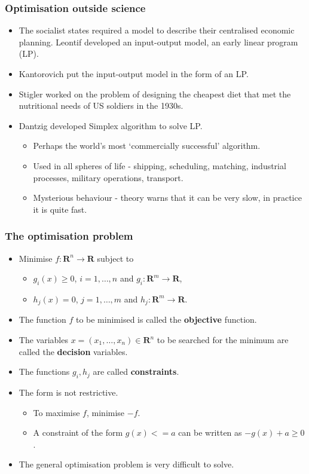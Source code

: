 \documentclass{beamer}
\newcommand{\sor}{\mathbf{R}}
\begin{document}
\begin{frame}
\frametitle{Optimisation outside science}
\begin{itemize}
\item The socialist states required a model to describe their centralised 
economic planning. Leontif developed an input-output model, an early linear
program (LP).
\item Kantorovich put the input-output model in the form of an LP.
\item Stigler worked on the problem of designing the cheapest diet that met
the nutritional needs of US soldiers in the 1930s.
\item Dantzig developed Simplex algorithm to solve LP.
\begin{itemize}
\item Perhaps the world's most `commercially successful' algorithm.
\item Used in all spheres of life - shipping, scheduling, matching, industrial
processes, military operations, transport.
\item Mysterious behaviour - theory warns that it can be very slow, in
practice it is quite fast.
\end{itemize}
\end{itemize}
\end{frame}

\begin{frame}
\frametitle{The optimisation problem}
\begin{itemize}
\item Minimise $f: \sor^n \rightarrow \sor$ subject to
\begin{itemize}
\item $g_i(x) \ge 0$, $i = 1, \ldots, n$ and $g_i: \sor^m \rightarrow \sor$,
\item $h_j(x) = 0$, $j = 1, \ldots, m$ and $h_j: \sor^m \rightarrow \sor$.
\end{itemize}
\item The function $f$ to be minimised is called the \textbf{objective}
function.
\item The variables $x = (x_1, \ldots, x_n) \in \sor^n$ to be searched for
the minimum are called the \textbf{decision} variables.
\item The functions $g_i, h_j$ are called \textbf{constraints}.
\item The form is not restrictive.
\begin{itemize}
\item To maximise $f$, minimise $-f$.
\item A constraint of the form $g(x) <= a$ can be written as $-g(x) + a \ge 0$.
\end{itemize}
\item The general optimisation problem is very difficult to solve.
\end{itemize}
\end{frame}
\end{document}

